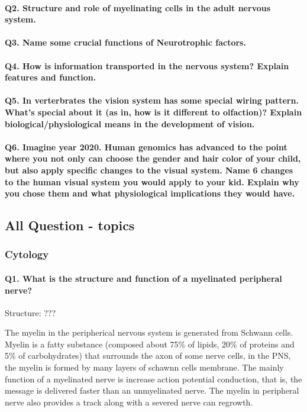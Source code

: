 \documentclass[12pt,article,oneside,a4paper]{memoir}
\begin{document}
\paragraph{Q2. Structure and role of myelinating cells in the adult nervous system.}
\paragraph{Q3. Name some crucial functions of Neurotrophic factors.}
\paragraph{Q4. How is information transported in the nervous system? Explain features and function.}
\paragraph{Q5. In verterbrates the vision system has some special wiring pattern. What's special about it (as in, how is it different to olfaction)? Explain biological/physiological means in the development of vision.}
\paragraph{Q6. Imagine year 2020. Human genomics has advanced to the point where you not only can choose the gender and hair color of your child, but also apply specific changes to the visual system. Name 6 changes to the human visual system you would apply to your kid. Explain why you chose them and what physiological implications they would have.}

\newpage
\subsection{All Question - topics}

\subsubsection{Cytology}
\paragraph{Q1. What is the structure and function of a myelinated peripheral nerve?}
Structure: ???

The myelin in the peripherical nervous system is generated from Schwann cells. Myelin is a fatty substance (composed about 75\% of lipids, 20\% of proteins and 5\% of carbohydrates) that surrounds the axon of some nerve cells, in the PNS, the myelin is formed by many layers of schawnn cells membrane. The mainly function of a myelinated nerve is increase action potential conduction, that is, the message is delivered faster than an unmyelinated nerve. The myelin in peripheral nerve also provides a track along with a severed nerve can regrowth.
\end{document}
